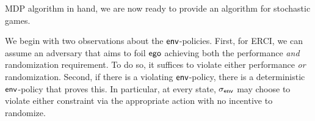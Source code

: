 
MDP algorithm in hand, we are now ready to provide an algorithm for
stochastic games.


 We begin with two observations
about the $\mathsf{env}$-policies.  First, for ERCI, we can assume an
adversary that aims to foil $\mathsf{ego}$ achieving both the performance
\emph{and} randomization requirement.  To do so, it suffices to
violate either performance \emph{or} randomization.  Second, if there
is a violating $\mathsf{env}$-policy, there is a deterministic $\mathsf{env}$-policy
that proves this.  In particular, at every state, ${\sigma_{\mathsf{env}}}$ may
choose to violate either constraint via the appropriate
action with no incentive to randomize.

